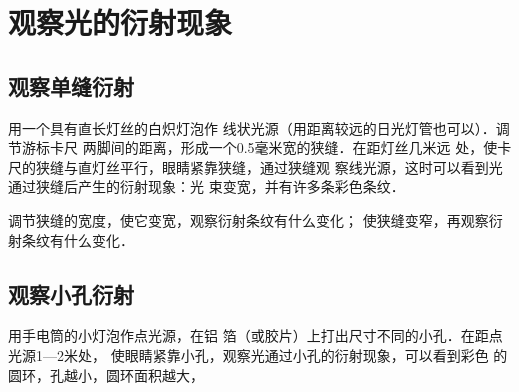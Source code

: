 \section{观察光的衍射现象}

\subsection{观察单缝衍射}

用一个具有直长灯丝的白炽灯泡作
线状光源（用距离较远的日光灯管也可以）．调节游标卡尺
两脚间的距离，形成一个0.5毫米宽的狭缝．在距灯丝几米远
处，使卡尺的狭缝与直灯丝平行，眼睛紧靠狭缝，通过狭缝观
察线光源，这时可以看到光通过狭缝后产生的衍射现象：光
束变宽，并有许多条彩色条纹．

调节狭缝的宽度，使它变宽，观察衍射条纹有什么变化；
使狭缝变窄，再观察衍射条纹有什么变化．

\subsection{观察小孔衍射}

用手电筒的小灯泡作点光源，在铝
箔（或胶片）上打出尺寸不同的小孔．在距点光源1—2米处，
使眼睛紧靠小孔，观察光通过小孔的衍射现象，可以看到彩色
的圆环，孔越小，圆环面积越大，


